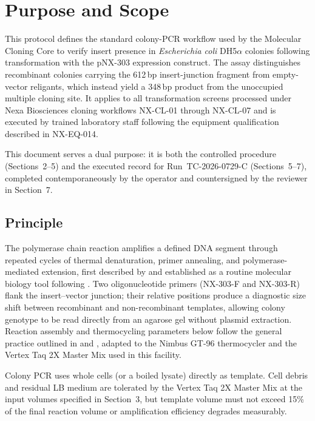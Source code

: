 \section{Purpose and Scope}

This protocol defines the standard colony-PCR workflow used by the Molecular Cloning Core to
verify insert presence in \textit{Escherichia coli} DH5$\alpha$ colonies following transformation
with the pNX-303 expression construct. The assay distinguishes recombinant colonies carrying the
612\,bp insert-junction fragment from empty-vector religants, which instead yield a 348\,bp
product from the unoccupied multiple cloning site. It applies to all transformation screens
processed under Nexa Biosciences cloning workflows NX-CL-01 through NX-CL-07 and is executed by
trained laboratory staff following the equipment qualification described in NX-EQ-014.

This document serves a dual purpose: it is both the controlled procedure (Sections~2--5) and the
executed record for Run~TC-2026-0729-C (Sections~5--7), completed contemporaneously by the
operator and countersigned by the reviewer in Section~7.

\subsection{Principle}

The polymerase chain reaction amplifies a defined DNA segment through repeated cycles of thermal
denaturation, primer annealing, and polymerase-mediated extension, first described by
\citet{mullis1987specific} and established as a routine molecular biology tool following
\citet{saiki1988primer}. Two oligonucleotide primers (NX-303-F and NX-303-R) flank the
insert--vector junction; their relative positions produce a diagnostic size shift between
recombinant and non-recombinant templates, allowing colony genotype to be read directly from an
agarose gel without plasmid extraction. Reaction assembly and thermocycling parameters below
follow the general practice outlined in \citet{green2019pcr} and \citet{sambrook2001molecular},
adapted to the Nimbus GT-96 thermocycler and the Vertex Taq 2X Master Mix used in this facility.

\begin{notebox}
Colony PCR uses whole cells (or a boiled lysate) directly as template. Cell debris and residual
LB medium are tolerated by the Vertex Taq 2X Master Mix at the input volumes specified in
Section~3, but template volume must not exceed 15\% of the final reaction volume or amplification
efficiency degrades measurably.
\end{notebox}
